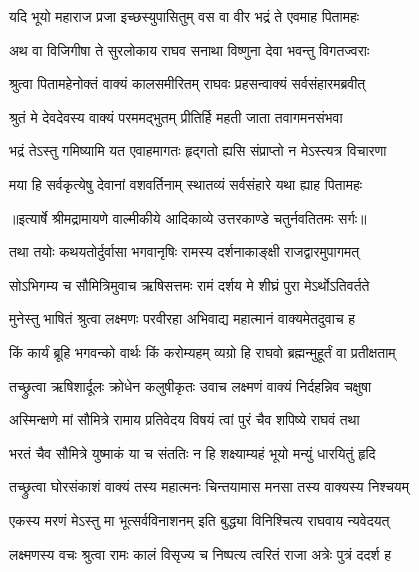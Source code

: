 \twolineshloka
{यदि भूयो महाराज प्रजा इच्छस्युपासितुम्}
{वस वा वीर भद्रं ते एवमाह पितामहः} %

\twolineshloka
{अथ वा विजिगीषा ते सुरलोकाय राघव}
{सनाथा विष्णुना देवा भवन्तु विगतज्वराः} %

\twolineshloka
{श्रुत्वा पितामहेनोक्तं वाक्यं कालसमीरितम्}
{राघवः प्रहसन्वाक्यं सर्वसंहारमब्रवीत्} %

\twolineshloka
{श्रुतं मे देवदेवस्य वाक्यं परममद्भुतम्}
{प्रीतिर्हि महती जाता तवागमनसंभवा} %

\twolineshloka
{भद्रं तेऽस्तु गमिष्यामि यत एवाहमागतः}
{हृद्गतो ह्यसि संप्राप्तो न मेऽस्त्यत्र विचारणा} %

\twolineshloka
{मया हि सर्वकृत्येषु देवानां वशवर्तिनाम्}
{स्थातव्यं सर्वसंहारे यथा ह्याह पितामहः} %


{॥इत्यार्षे श्रीमद्रामायणे वाल्मीकीये आदिकाव्ये उत्तरकाण्डे चतुर्नवतितमः सर्गः॥}


\twolineshloka
{तथा तयोः कथयतोर्दुर्वासा भगवानृषिः}
{रामस्य दर्शनाकाङ्क्षी राजद्वारमुपागमत्} %

\twolineshloka
{सोऽभिगम्य च सौमित्रिमुवाच ऋषिसत्तमः}
{रामं दर्शय मे शीघ्रं पुरा मेऽर्थोऽतिवर्तते} %

\twolineshloka
{मुनेस्तु भाषितं श्रुत्वा लक्ष्मणः परवीरहा}
{अभिवाद्य महात्मानं वाक्यमेतदुवाच ह} %

\twolineshloka
{किं कार्यं ब्रूहि भगवन्को वार्थः किं करोम्यहम्}
{व्यग्रो हि राघवो ब्रह्मन्मुहूर्तं वा प्रतीक्षताम्} %

\twolineshloka
{तच्छ्रुत्वा ऋषिशार्दूलः क्रोधेन कलुषीकृतः}
{उवाच लक्ष्मणं वाक्यं निर्दहन्निव चक्षुषा} %

\twolineshloka
{अस्मिन्क्षणे मां सौमित्रे रामाय प्रतिवेदय}
{विषयं त्वां पुरं चैव शपिष्ये राघवं तथा} %

\twolineshloka
{भरतं चैव सौमित्रे युष्माकं या च संततिः}
{न हि शक्ष्याम्यहं भूयो मन्युं धारयितुं हृदि} %

\twolineshloka
{तच्छ्रुत्वा घोरसंकाशं वाक्यं तस्य महात्मनः}
{चिन्तयामास मनसा तस्य वाक्यस्य निश्चयम्} %

\twolineshloka
{एकस्य मरणं मेऽस्तु मा भूत्सर्वविनाशनम्}
{इति बुद्ध्या विनिश्चित्य राघवाय न्यवेदयत्} %

\twolineshloka
{लक्ष्मणस्य वचः श्रुत्वा रामः कालं विसृज्य च}
{निष्पत्य त्वरितं राजा अत्रेः पुत्रं ददर्श ह} %


